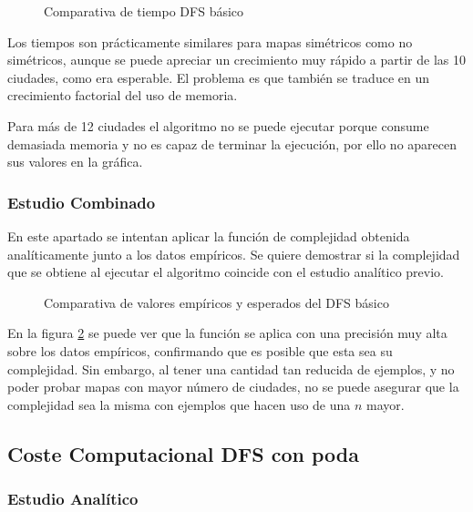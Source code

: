 \documentclass{uc3mpracticas}
\begin{document}
  \begin{figure}[!h]
    \caption{Comparativa de tiempo DFS básico}
    \label{fig:compDFS}
  \end{figure}


  Los tiempos son prácticamente similares para mapas simétricos como no simétricos, aunque se puede apreciar un crecimiento muy rápido a partir de las 10 ciudades, como era esperable. El problema es que también se traduce en un crecimiento factorial del uso de memoria.

  \vspace{2mm}

  Para más de 12 ciudades el algoritmo no se puede ejecutar porque consume demasiada memoria y no es capaz de terminar la ejecución, por ello no aparecen sus valores en la gráfica.

  \subsubsection{Estudio Combinado}

  En este apartado se intentan aplicar la función de complejidad obtenida analíticamente junto a los datos empíricos. Se quiere demostrar si la complejidad que se obtiene al ejecutar el algoritmo coincide con el estudio analítico previo.

  \begin{figure}[!h]
    \caption{Comparativa de valores empíricos y esperados del DFS básico}
    \label{fig:comp_combDFS}
  \end{figure}

  En la figura \ref{fig:comp_combDFS} se puede ver que la función se aplica con una precisión muy alta sobre los datos empíricos, confirmando que es posible que esta sea su complejidad. Sin embargo, al tener una cantidad tan reducida de ejemplos, y no poder probar mapas con mayor número de ciudades, no se puede asegurar que la complejidad sea la misma con ejemplos que hacen uso de una $n$ mayor.


  \subsection{Coste Computacional DFS con poda}

  \subsubsection{Estudio Analítico}
\end{document}
